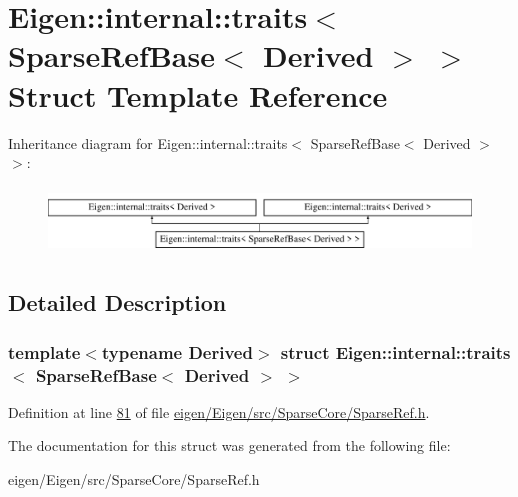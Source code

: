 \hypertarget{struct_eigen_1_1internal_1_1traits_3_01_sparse_ref_base_3_01_derived_01_4_01_4}{}\section{Eigen\+:\+:internal\+:\+:traits$<$ Sparse\+Ref\+Base$<$ Derived $>$ $>$ Struct Template Reference}
\label{struct_eigen_1_1internal_1_1traits_3_01_sparse_ref_base_3_01_derived_01_4_01_4}
Inheritance diagram for Eigen\+:\+:internal\+:\+:traits$<$ Sparse\+Ref\+Base$<$ Derived $>$ $>$\+:\begin{figure}[H]
\begin{center}
\leavevmode
\includegraphics[height=1.789137cm]{struct_eigen_1_1internal_1_1traits_3_01_sparse_ref_base_3_01_derived_01_4_01_4}
\end{center}
\end{figure}


\subsection{Detailed Description}
\subsubsection*{template$<$typename Derived$>$\newline
struct Eigen\+::internal\+::traits$<$ Sparse\+Ref\+Base$<$ Derived $>$ $>$}



Definition at line \hyperlink{eigen_2_eigen_2src_2_sparse_core_2_sparse_ref_8h_source_l00081}{81} of file \hyperlink{eigen_2_eigen_2src_2_sparse_core_2_sparse_ref_8h_source}{eigen/\+Eigen/src/\+Sparse\+Core/\+Sparse\+Ref.\+h}.



The documentation for this struct was generated from the following file\+:\begin{DoxyCompactItemize}
\item 
eigen/\+Eigen/src/\+Sparse\+Core/\+Sparse\+Ref.\+h\end{DoxyCompactItemize}
